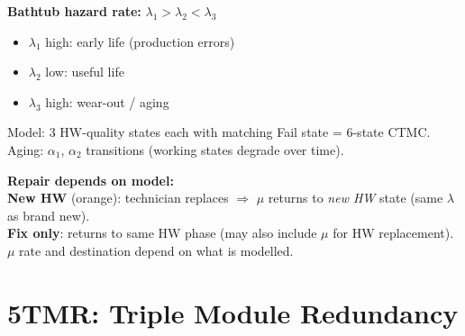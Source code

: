 \documentclass[10pt,a4paper]{article}
\begin{document}
\begin{minipage}[t]{0.55\textwidth}
\vspace{0pt}
\begin{keybox}
\small\textbf{Bathtub hazard rate:} $\lambda_1 > \lambda_2 < \lambda_3$
\begin{itemize}
  \item $\lambda_1$ high: early life (production errors)
  \item $\lambda_2$ low: useful life
  \item $\lambda_3$ high: wear-out / aging
\end{itemize}
Model: 3 HW-quality states each with matching Fail state = 6-state CTMC. Aging: $\alpha_1$, $\alpha_2$ transitions (working states degrade over time).
\end{keybox}
\vspace{2pt}
\begin{notebox}
\small\textbf{Repair depends on model:}\\
\textbf{New HW} (orange): technician replaces $\Rightarrow$ $\mu$ returns to \emph{new HW} state (same $\lambda$ as brand new).\\
\textbf{Fix only}: returns to same HW phase (may also include $\mu$ for HW replacement). $\mu$ rate and destination depend on what is modelled.
\end{notebox}
\end{minipage}

\vspace{4pt}

\section*{5\quad TMR: Triple Module Redundancy}
\end{document}
